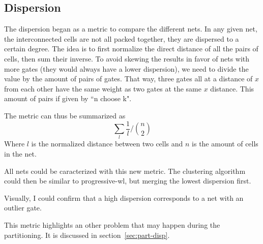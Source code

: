 \subsection{Dispersion}\label{sec:disp-clust}
The dispersion began as a metric to compare the different nets.
In any given net, the interconnected cells are not all packed together, they are dispersed to a certain degree.
The idea is to first normalize the direct distance of all the pairs of cells, then sum their inverse.
To avoid skewing the results in favor of nets with more gates (they would always have a lower dispersion), we need to divide the value by the amount of pairs of gates.
That way, three gates all at a distance of $x$ from each other have the same weight as two gates at the same $x$ distance.
This amount of pairs if given by ``n choose k".

The metric can thus be summarized as
\[ \sum_l \frac{1}{l}/ \binom{n}{2} \] %
Where $l$ is the normalized distance between two cells and $n$ is the amount of cells in the net.

All nets could be caracterized with this new metric.
The clustering algorithm could then be similar to progressive-wl, but merging the lowest dispersion first.

Visually, I could confirm that a high dispersion corresponds to a net with an outlier gate.

This metric highlights an other problem that may happen during the partitioning.
It is discussed in section~\ref{sec:part-disp}.
